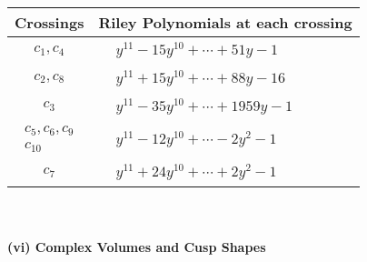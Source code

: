 \documentclass[1p]{elsarticle_modified}
\theoremstyle{definition}
\begin{document}
\begin{tabular}{m{50pt}|m{274pt}}
Crossings & \hspace{64pt}Riley Polynomials at each crossing \\
\hline $$\begin{aligned}c_{1},c_{4}\end{aligned}$$&$\begin{aligned}
&y^{11}-15 y^{10}+\cdots+51 y-1
\end{aligned}$\\
\hline $$\begin{aligned}c_{2},c_{8}\end{aligned}$$&$\begin{aligned}
&y^{11}+15 y^{10}+\cdots+88 y-16
\end{aligned}$\\
\hline $$\begin{aligned}c_{3}\end{aligned}$$&$\begin{aligned}
&y^{11}-35 y^{10}+\cdots+1959 y-1
\end{aligned}$\\
\hline $$\begin{aligned}c_{5},c_{6},c_{9}\\c_{10}\end{aligned}$$&$\begin{aligned}
&y^{11}-12 y^{10}+\cdots-2 y^2-1
\end{aligned}$\\
\hline $$\begin{aligned}c_{7}\end{aligned}$$&$\begin{aligned}
&y^{11}+24 y^{10}+\cdots+2 y^2-1
\end{aligned}$\\
\hline
\end{tabular}\\~\\
\newpage\flushleft \textbf{(vi) Complex Volumes and Cusp Shapes}
\end{document}
